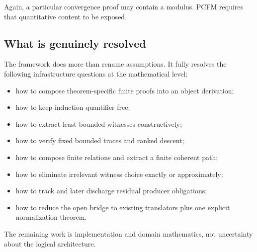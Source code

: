 Again, a particular convergence proof may contain a modulus.  PCFM requires
that quantitative content to be exposed.

\subsection{What is genuinely resolved}

The framework does more than rename assumptions.  It fully resolves the
following infrastructure questions at the mathematical level:

\begin{itemize}
\item how to compose theorem-specific finite proofs into an object derivation;
\item how to keep induction quantifier free;
\item how to extract least bounded witnesses constructively;
\item how to verify fixed bounded traces and ranked descent;
\item how to compose finite relations and extract a finite coherent path;
\item how to eliminate irrelevant witness choice exactly or approximately;
\item how to track and later discharge residual producer obligations;
\item how to reduce the open bridge to existing translators plus one explicit
normalization theorem.
\end{itemize}

The remaining work is implementation and domain mathematics, not uncertainty
about the logical architecture.
